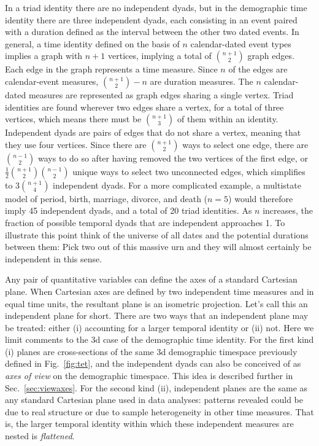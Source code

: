 \documentclass{bmcart}
\begin{document}
 In a triad identity there are no independent dyads, but in the demographic time identity there are three independent dyads, each consisting in an event paired with a duration defined as the interval between the other two dated events. In general, a time identity defined on the basis of $n$ calendar-dated event types implies a graph with $n+1$ vertices, implying a total of $\binom{n+1}{2}$ graph edges. Each edge in the graph represents a time measure. Since $n$ of the edges are calendar-event measures, $\binom{n+1}{2} - n$ are duration measures. The $n$ calendar-dated measures are represented as graph edges sharing a single vertex. Triad identities are found wherever two edges share a vertex, for a total of three vertices, which means there must be $\binom{n+1}{3}$ of them within an identity. Independent dyads are pairs of edges that do not share a vertex, meaning that they use four vertices. Since there are $\binom{n+1}{2}$ ways to select one edge, there are $\binom{n-1}{2}$ ways to do so after having removed the two vertices of the first edge, or $\frac{1}{2}\binom{n+1}{2}\binom{n-1}{2}$ unique ways to select two unconnected edges, which simplifies to $3\binom{n+1}{4}$ independent dyads. For a more complicated example, a multistate model of period, birth, marriage, divorce, and death ($n=5$) would therefore imply 45 independent dyads, and a total of 20 triad identities. As $n$ increases, the fraction of possible temporal dyads that are independent approaches 1. To illustrate this point think of the universe of all dates and the potential durations between them: Pick two out of this massive urn and they will almost certainly be independent in this sense.

Any pair of quantitative variables can define the axes of a standard Cartesian plane. When Cartesian axes are defined by two independent time measures and in equal time units, the resultant plane is an isometric projection. Let's call this an independent plane for short. There are two ways that an independent plane may be treated: either (i) accounting for a larger temporal identity or (ii) not. Here we limit comments to the 3d case of the demographic time identity. For the first kind (i) planes are cross-sections of the same 3d demographic timespace previously defined in Fig.~\ref{fig:tet}, and the independent dyads can also be conceived of as \emph{axes of view} on the demographic timespace. This idea is described further in Sec.~\ref{sec:viewaxes}. For the second kind (ii), independent planes are the same as any standard Cartesian plane used in data analyses: patterns revealed could be due to real structure or due to sample heterogeneity in other time measures. That is, the larger temporal identity within which these independent measures are nested is \emph{flattened}.
\end{document}
